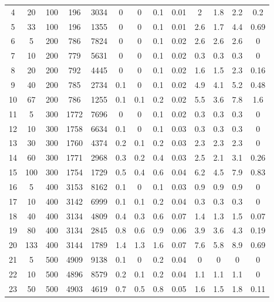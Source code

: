 \documentclass[11pt]{article}
\newcommand{\np}{\newpage}
\begin{document}
\begin{appendices}
\begin{landscape}
\begin{longtable}[c]{ccccc|cccc|cccc}
				\rowcolor[HTML]{EFEFEF} 
				4 & 20 & 100 & 196 & 3034 & 0 & 0 & 0.1 & 0.01 & 2 & 1.8 & 2.2 & 0.2 \\
				\rowcolor[HTML]{EFEFEF} 
				5 & 33 & 100 & 196 & 1355 & 0 & 0 & 0.1 & 0.01 & 2.6 & 1.7 & 4.4 & 0.69 \\
				6 & 5 & 200 & 786 & 7824 & 0 & 0 & 0.1 & 0.02 & 2.6 & 2.6 & 2.6 & 0 \\
				7 & 10 & 200 & 779 & 5631 & 0 & 0 & 0.1 & 0.02 & 0.3 & 0.3 & 0.3 & 0 \\
				8 & 20 & 200 & 792 & 4445 & 0 & 0 & 0.1 & 0.02 & 1.6 & 1.5 & 2.3 & 0.16 \\
				9 & 40 & 200 & 785 & 2734 & 0.1 & 0 & 0.1 & 0.02 & 4.9 & 4.1 & 5.2 & 0.48 \\
				10 & 67 & 200 & 786 & 1255 & 0.1 & 0.1 & 0.2 & 0.02 & 5.5 & 3.6 & 7.8 & 1.6 \\
				\rowcolor[HTML]{EFEFEF} 
				11 & 5 & 300 & 1772 & 7696 & 0 & 0 & 0.1 & 0.02 & 0.3 & 0.3 & 0.3 & 0 \\
				\rowcolor[HTML]{EFEFEF} 
				12 & 10 & 300 & 1758 & 6634 & 0.1 & 0 & 0.1 & 0.03 & 0.3 & 0.3 & 0.3 & 0 \\
				\rowcolor[HTML]{EFEFEF} 
				13 & 30 & 300 & 1760 & 4374 & 0.2 & 0.1 & 0.2 & 0.03 & 2.3 & 2.3 & 2.3 & 0 \\
				\rowcolor[HTML]{EFEFEF} 
				14 & 60 & 300 & 1771 & 2968 & 0.3 & 0.2 & 0.4 & 0.03 & 2.5 & 2.1 & 3.1 & 0.26 \\
				\rowcolor[HTML]{EFEFEF} 
				15 & 100 & 300 & 1754 & 1729 & 0.5 & 0.4 & 0.6 & 0.04 & 6.2 & 4.5 & 7.9 & 0.83 \\
				16 & 5 & 400 & 3153 & 8162 & 0.1 & 0 & 0.1 & 0.03 & 0.9 & 0.9 & 0.9 & 0 \\
				17 & 10 & 400 & 3142 & 6999 & 0.1 & 0.1 & 0.2 & 0.04 & 0.3 & 0.3 & 0.3 & 0 \\
				18 & 40 & 400 & 3134 & 4809 & 0.4 & 0.3 & 0.6 & 0.07 & 1.4 & 1.3 & 1.5 & 0.07 \\
				19 & 80 & 400 & 3134 & 2845 & 0.8 & 0.6 & 0.9 & 0.06 & 3.9 & 3.6 & 4.3 & 0.19 \\
				20 & 133 & 400 & 3144 & 1789 & 1.4 & 1.3 & 1.6 & 0.07 & 7.6 & 5.8 & 8.9 & 0.69 \\ \np
				\rowcolor[HTML]{EFEFEF} 
				21 & 5 & 500 & 4909 & 9138 & 0.1 & 0 & 0.2 & 0.04 & 0 & 0 & 0 & 0 \\
				\rowcolor[HTML]{EFEFEF} 
				22 & 10 & 500 & 4896 & 8579 & 0.2 & 0.1 & 0.2 & 0.04 & 1.1 & 1.1 & 1.1 & 0 \\
				\rowcolor[HTML]{EFEFEF} 
				23 & 50 & 500 & 4903 & 4619 & 0.7 & 0.5 & 0.8 & 0.05 & 1.6 & 1.5 & 1.8 & 0.11 \\

\end{longtable}
\end{landscape}
\end{appendices}
\end{document}
